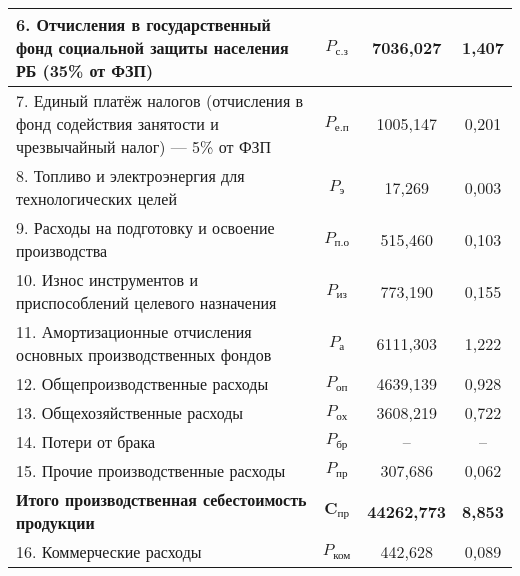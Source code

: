 {\begin{longtable}{| m{10.7cm} | c | c | c |}
      6. Отчисления в государственный фонд социальной \newline
      защиты населения РБ (35\% от ФЗП)
      & \( P_{\text{с.з}} \) & 7036{,}027 & 1{,}407 \\
      \hline

      7. Единый платёж налогов (отчисления в фонд содействия \newline
      занятости и чрезвычайный налог) --- 5\% от ФЗП
      & \( P_{\text{е.п}} \) & 1005{,}147 & 0{,}201 \\
      \hline

      8. Топливо и электроэнергия для технологических целей
      & \( P_{\text{э}} \) & 17{,}269 & 0{,}003 \\
      \hline

      9. Расходы на подготовку и освоение производства
      & \( P_{\text{п.о}} \) & 515{,}460 & 0{,}103 \\
      \hline

      10. Износ инструментов и приспособлений \newline
      целевого назначения
      & \( P_{\text{из}} \) & 773{,}190 & 0{,}155 \\
      \hline

      11. Амортизационные отчисления основных \newline 
      производственных фондов
      & \( P_{\text{а}} \) & 6111{,}303 & 1{,}222 \\
      \hline

      12. Общепроизводственные расходы
      & \( P_{\text{оп}} \) & 4639{,}139 & 0{,}928 \\
      \hline

      13. Общехозяйственные расходы
      & \( P_{\text{ох}} \) & 3608{,}219 & 0{,}722 \\
      \hline

      14. Потери от брака
      & \( P_{\text{бр}} \) & -- & -- \\
      \hline

      15. Прочие производственные расходы
      & \( P_{\text{пр}} \) & 307{,}686 & 0{,}062 \\
      \hline

      \textbf{Итого \newline производственная себестоимость продукции}
      & \( \mathbf{C_{\text{пр}}} \) & \textbf{44262{,}773} & \textbf{8{,}853} \\
      \hline

      16. Коммерческие расходы
      & \( P_{\text{ком}} \) & 442{,}628 & 0{,}089 \\
      \hline


\end{longtable}}
